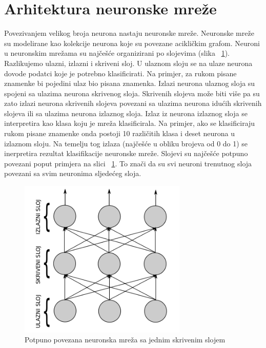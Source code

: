\documentclass[times, utf8, zavrsni, numeric]{fer}
\begin{document}
\section{Arhitektura neuronske mreže}
Povezivanjem velikog broja neurona nastaju neuronske mreže. Neuronske mreže su modelirane kao kolekcije neurona koje su povezane acikličkim grafom. Neuroni u neuronskim mrežama su najčešće organizirani po slojevima (slika ~\ref{fig:neuronska-mreza}). Razlikujemo ulazni, izlazni i skriveni sloj. U ulaznom sloju se na ulaze neurona dovode podatci koje je potrebno klasificirati. Na primjer, za rukom pisane znamenke bi pojedini ulaz bio pisana znamenka. Izlazi neurona ulaznog sloja su spojeni sa ulazima neurona skrivenog sloja. Skrivenih slojeva može biti više pa su zato izlazi neurona skrivenih slojeva povezani sa ulazima neurona idućih skrivenih slojeva ili sa ulazima neurona izlaznog sloja. Izlaz iz neurona izlaznog sloja se interpretira kao klasa koju je mreža klasificirala. Na primjer, ako se klasificiraju rukom pisane znamenke onda postoji 10 različitih klasa i deset neurona u izlaznom sloju. Na temelju tog izlaza (najčešće u obliku brojeva od 0 do 1) se inerpretira rezultat klasifikacije neuronske mreže. Slojevi su najčešće potpuno povezani poput primjera na slici ~\ref{fig:neuronska-mreza}. To znači da su svi neuroni trenutnog sloja povezani sa svim neuronima sljedećeg sloja.

\begin{figure}
    \centering
    \includegraphics[width=8cm]{img/slojevi-neuronska-mreza.png}
    \caption{Potpuno povezana neuronska mreža sa jednim skrivenim slojem}
    \label{fig:neuronska-mreza}
\end{figure}
\end{document}
